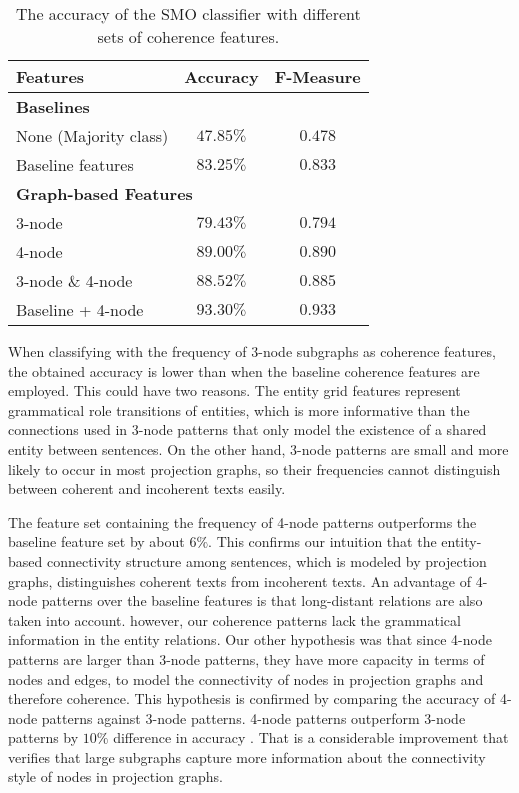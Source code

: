 \begin{table}[!ht]
	\begin{center}
		\begin{tabular}{lcc}
			\hline
			Features 						  & Accuracy		& F-Measure	\\
			\hline
			\multicolumn{2}{l}{\textbf{Baselines}}								\\
			None (Majority class) 			  & $47.85\%$		& $0.478$		\\
			Baseline features 			  	  & $83.25\%$     	& $0.833$		\\
			\hline
		
			\multicolumn{2}{l}{\textbf{Graph-based Features}}					\\
			3-node 							  & $79.43\%$		& $0.794$		\\
			4-node 						      & $89.00\%$		& $0.890$		\\
			3-node \& 4-node 				  & $88.52\%$		& $0.885$		\\
			Baseline + 4-node 				  & $93.30\%$		& $0.933$		\\
			\hline
		\end{tabular}
	\end{center}
	\caption{The accuracy of the SMO classifier with different sets of coherence features.}
	\label{tab:ranking-pitler}
\end{table}

When classifying with the frequency of 3-node subgraphs as coherence features, the obtained accuracy is lower than when the baseline coherence features are employed.  
This could have two reasons. 
The entity grid features represent grammatical role transitions of entities, which is more informative than the connections used in 3-node patterns that only model the existence of a shared entity between sentences. 
On the other hand, 3-node patterns are small and more likely to occur in most projection graphs, so their frequencies cannot distinguish between coherent and incoherent texts easily. 

The feature set containing the frequency of 4-node patterns outperforms the baseline feature set by about $6\%$. 
This confirms our intuition that the entity-based connectivity structure among sentences, which is modeled by projection graphs, distinguishes coherent texts from incoherent texts. 
An advantage of 4-node patterns over the baseline features is that long-distant relations are also taken into account. 
however, our coherence patterns lack the grammatical information in the entity relations. 
Our other hypothesis was that since 4-node patterns are larger than 3-node patterns, they have more capacity in terms of nodes and edges, to model the connectivity of nodes in projection graphs and therefore coherence. 
This hypothesis is confirmed by comparing the accuracy of 4-node patterns against 3-node patterns.
4-node patterns outperform 3-node patterns by $10\%$ difference in accuracy . 
That is a considerable improvement that verifies that large subgraphs capture more information about the connectivity style of nodes in projection graphs.    

